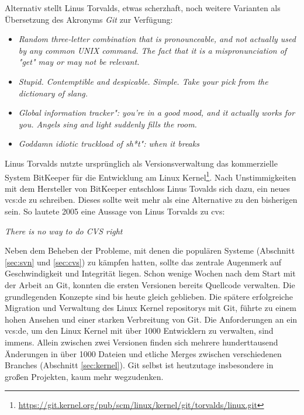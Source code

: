 Alternativ stellt Linus Torvalds, etwas scherzhaft, noch weitere Varianten als Übersetzung des
Akronyms \textit{Git} zur Verf\-ügung\cite{link:gitfaq}:

\begin{itemize}
  \item \textit{\glqq{}Random three-letter combination that is pronounceable, and not
  actually used by any common UNIX command. The fact that it is a
  mispronunciation of "get" may or may not be relevant.\grqq{}}
  \item \textit{\glqq{}Stupid. Contemptible and despicable. Simple. Take your pick from the
  dictionary of slang.\grqq{}}
  \item \textit{\glqq{}Global information tracker": you're in a good mood, and it actually
  works for you. Angels sing and light suddenly fills the room.\grqq{}}
  \item \textit{\glqq{}Goddamn idiotic truckload of sh*t": when it breaks\grqq{}}
\end{itemize}

Linus Torvalds nutzte ursprünglich als Versionsverwaltung das kommerzielle
System BitKeeper für die Entwicklung am Linux
Kernel\footnote{\url{https://git.kernel.org/pub/scm/linux/kernel/git/torvalds/linux.git}}.
Nach Unstimmigkeiten mit dem Hersteller von BitKeeper entschloss Linus Tovalds
sich dazu, ein neues \gls{vcs:de} zu schreiben. Dieses sollte weit mehr als
eine Alternative zu den bisherigen sein\cite[S.~13]{gitosp}. So lautete 2005
eine Aussage von Linus Torvalds zu \acrshort{cvs}\cite[S.~385]{cd}:

\begin{center}
\textit{\glqq{}There is no way to do CVS right\grqq{}}\\
\end{center}

Neben dem Beheben der Probleme, mit denen die populären Systeme (Abschnitt
\ref{sec:svn} und \ref{sec:cvs}) zu kämpfen hatten, sollte das zentrale
Augenmerk auf Geschwindigkeit und Integrität liegen. Schon wenige Wochen nach
dem Start mit der Arbeit an Git, konnten die ersten Versionen bereits Quellcode
verwalten. Die grundlegenden Konzepte sind bis heute gleich geblieben. Die
spätere erfolgreiche Migration und Verwaltung des Linux Kernel
\glspl{repository} mit Git, führte zu einem hohen Ansehen und einer starken
Verbreitung von Git. Die Anforderungen an ein \acrlong{vcs:de}, um den Linux Kernel
mit über 1000 Entwicklern zu verwalten, sind immens. Allein zwischen zwei
Versionen finden sich mehrere hunderttausend Änderungen in über 1000 Dateien
und etliche Merges zwischen verschiedenen Branches (Abschnitt
\ref{sec:kernel}). Git selbst ist heutzutage insbesondere in großen Projekten,
kaum mehr wegzudenken.\cite[S.~13]{gitosp}

